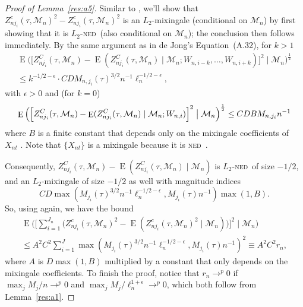 \documentclass[12pt]{article}
\theoremstyle{definition}
\DeclareMathOperator{\E}{E}
\newcommand{\ned}{\textsc{ned}}
\begin{document}
\begin{proof}[Proof of Lemma~\ref{res:a5}]
  Similar to \citet[Lemma 5]{Jon:97}, we'll show that
  $Z^c_{nj_i}(\tau, \mathcal{M}_n)^2 - Z^c_{nj_i}(\tau,
  \mathcal{M}_n)^2$ is an $L_2$-mixingale (conditional on
  $\mathcal{M}_n$) by first showing that it is $L_2$-\ned\ (also
  conditional on $\mathcal{M}_n$); the conclusion then follows
  immediately.   By the same argument as in de Jong's
  Equation~(A.32), for $k > 1$
  \begin{multline}
    \E\Big( \Big[Z_{nj_i}^C(\tau, \mathcal{M}_n) - \E(
    Z_{nj_i}^C(\tau, \mathcal{M}_n) \mid \mathcal{M}_n;
    W_{n,i-k},\dots,W_{n,i+k}) \Big]^2 \;\big|\; \mathcal{M}_n
    \Big)^{\frac12}\\ \leq k^{-1/2-\epsilon} \cdot C D
    M_{n,j_i}(\tau)^{3/2} n^{-1} \ell_n^{-1/2-\epsilon},
  \end{multline}
  with $\epsilon > 0$ and (for $k = 0$)
  \begin{equation}
    \E\Big(\Big[ Z_{nj_i}^C(\tau, \mathcal{M}_n) - \E (Z_{nj_i}^C(\tau,
    \mathcal{M}_n) \mid \mathcal{M}_n; W_{n,i}) \Big]^2 \;\big|\; \mathcal{M}_n
    \Big)^{\frac12} \\ \leq C D B M_{n,j_i} n^{-1}
  \end{equation}
  where $B$ is a finite constant that depends only on the mixingale
  coefficients of $X_{nt}$ \citep[see][for details]{Mcl:75}.  Note
  that $\{X_{nt}\}$ is a mixingale because it is \ned\ \citep[see,
  e.g.][Theorem 17.5]{Dav:94}.

  Consequently, $Z_{nj_i}^C(\tau, \mathcal{M}_n) - \E(Z_{nj_i}^C(\tau,
  \mathcal{M}_n) \mid \mathcal{M}_n)$ is $L_2$-\ned\ of size $-1/2$,
  and an $L_2$-mixingale of size $-1/2$ as well with magnitude indices
  \begin{equation}
    C D \max(M_{j_i}(\tau)^{3/2} n^{-1}
    \ell_n^{-1/2-\epsilon}, M_{j_i}(\tau) n^{-1}) \max(1, B).
  \end{equation}
  So, using \citet[Theorem 1.6]{Mcl:75} again, we have the bound
  \begin{multline}
    \E\Bigg(\Bigg[ \sum_{i=1}^{J_n} \big(Z_{nj_i}^c(\tau,
    \mathcal{M}_n)^2 - \E(Z_{nj_i}^c(\tau, \mathcal{M}_n)^2 \mid
    \mathcal{M}_n)\big) \Bigg]^2 \;\Big|\; \mathcal{M}_n\Bigg) \\ \leq
    A^2 C^2 \sum_{i=1}^J \max(M_{j_i}(\tau)^{3/2} n^{-1}
    \ell_n^{-1/2-\epsilon}, M_{j_i}(\tau) n^{-1})^2 \equiv A^2 C^2 r_n,
  \end{multline}
  where $A$ is $D \max(1,B)$ multiplied by a constant that only
  depends on the mixingale coefficients.  To finish the proof, notice
  that $r_n \to^p 0$ if $\max_j M_j/n \to^p 0$ and $\max_j M_j /
  \ell_n^{1+\epsilon} \to^p 0$, which both follow from Lemma~\ref{res:a1}.
\end{proof}
\end{document}
